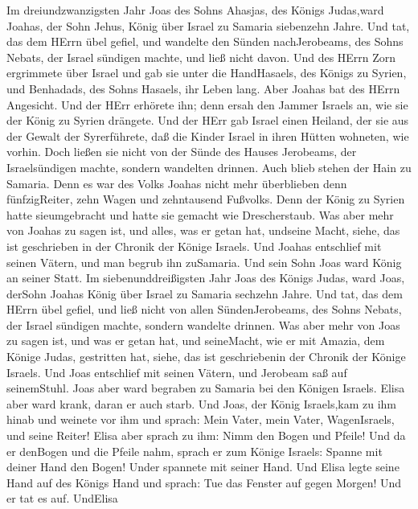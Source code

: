  Im dreiundzwanzigsten Jahr Joas des Sohns Ahasjas, des
Königs Judas,ward Joahas, der Sohn Jehus, König über Israel zu Samaria
siebenzehn Jahre.  Und tat, das dem HErrn übel gefiel, und
wandelte den Sünden nachJerobeams, des Sohns Nebats, der Israel sündigen
machte, und ließ nicht davon.  Und des HErrn Zorn ergrimmete
über Israel und gab sie unter die HandHasaels, des Königs zu Syrien, und
Benhadads, des Sohns Hasaels, ihr Leben lang.  Aber Joahas
bat des HErrn Angesicht. Und der HErr erhörete ihn; denn ersah den
Jammer Israels an, wie sie der König zu Syrien drängete. 
Und der HErr gab Israel einen Heiland, der sie aus der Gewalt der
Syrerführete, daß die Kinder Israel in ihren Hütten wohneten, wie
vorhin.  Doch ließen sie nicht von der Sünde des Hauses
Jerobeams, der Israelsündigen machte, sondern wandelten drinnen. Auch
blieb stehen der Hain zu Samaria.  Denn es war des Volks
Joahas nicht mehr überblieben denn fünfzigReiter, zehn Wagen und
zehntausend Fußvolks. Denn der König zu Syrien hatte sieumgebracht und
hatte sie gemacht wie Drescherstaub.  Was aber mehr von
Joahas zu sagen ist, und alles, was er getan hat, undseine Macht, siehe,
das ist geschrieben in der Chronik der Könige Israels.  Und
Joahas entschlief mit seinen Vätern, und man begrub ihn zuSamaria. Und
sein Sohn Joas ward König an seiner Statt.  Im
siebenunddreißigsten Jahr Joas des Königs Judas, ward Joas, derSohn
Joahas König über Israel zu Samaria sechzehn Jahre.  Und
tat, das dem HErrn übel gefiel, und ließ nicht von allen
SündenJerobeams, des Sohns Nebats, der Israel sündigen machte, sondern
wandelte drinnen.  Was aber mehr von Joas zu sagen ist, und
was er getan hat, und seineMacht, wie er mit Amazia, dem Könige Judas,
gestritten hat, siehe, das ist geschriebenin der Chronik der Könige
Israels.  Und Joas entschlief mit seinen Vätern, und
Jerobeam saß auf seinemStuhl. Joas aber ward begraben zu Samaria bei den
Königen Israels.  Elisa aber ward krank, daran er auch
starb. Und Joas, der König Israels,kam zu ihm hinab und weinete vor ihm
und sprach: Mein Vater, mein Vater, WagenIsraels, und seine Reiter!
 Elisa aber sprach zu ihm: Nimm den Bogen und Pfeile! Und
da er denBogen und die Pfeile nahm,  sprach er zum Könige
Israels: Spanne mit deiner Hand den Bogen! Under spannete mit seiner
Hand. Und Elisa legte seine Hand auf des Königs Hand  und
sprach: Tue das Fenster auf gegen Morgen! Und er tat es auf. UndElisa
